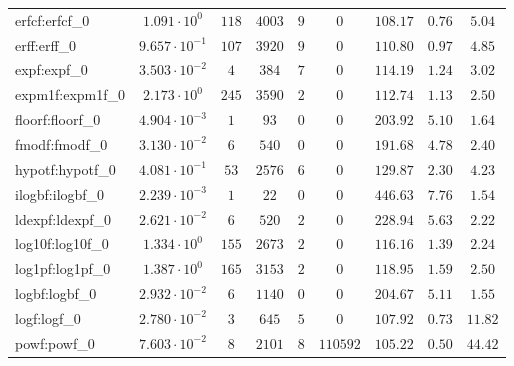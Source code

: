 \begin{tabular}{|l|c|c|c|c|c|c|c|c|}
erfcf:erfcf\_0               & $ 1.091 \cdot 10^{0}  $ & $ 118    $ & $ 4003   $ & $ 9   $ & $ 0      $ & $ 108.17      $ & $ 0.76    $ & $ 5.04    $ \\
erff:erff\_0                 & $ 9.657 \cdot 10^{-1} $ & $ 107    $ & $ 3920   $ & $ 9   $ & $ 0      $ & $ 110.80      $ & $ 0.97    $ & $ 4.85    $ \\
expf:expf\_0                 & $ 3.503 \cdot 10^{-2} $ & $ 4      $ & $ 384    $ & $ 7   $ & $ 0      $ & $ 114.19      $ & $ 1.24    $ & $ 3.02    $ \\
expm1f:expm1f\_0             & $ 2.173 \cdot 10^{0}  $ & $ 245    $ & $ 3590   $ & $ 2   $ & $ 0      $ & $ 112.74      $ & $ 1.13    $ & $ 2.50    $ \\
floorf:floorf\_0             & $ 4.904 \cdot 10^{-3} $ & $ 1      $ & $ 93     $ & $ 0   $ & $ 0      $ & $ 203.92      $ & $ 5.10    $ & $ 1.64    $ \\
fmodf:fmodf\_0               & $ 3.130 \cdot 10^{-2} $ & $ 6      $ & $ 540    $ & $ 0   $ & $ 0      $ & $ 191.68      $ & $ 4.78    $ & $ 2.40    $ \\
hypotf:hypotf\_0             & $ 4.081 \cdot 10^{-1} $ & $ 53     $ & $ 2576   $ & $ 6   $ & $ 0      $ & $ 129.87      $ & $ 2.30    $ & $ 4.23    $ \\
ilogbf:ilogbf\_0             & $ 2.239 \cdot 10^{-3} $ & $ 1      $ & $ 22     $ & $ 0   $ & $ 0      $ & $ 446.63      $ & $ 7.76    $ & $ 1.54    $ \\
ldexpf:ldexpf\_0             & $ 2.621 \cdot 10^{-2} $ & $ 6      $ & $ 520    $ & $ 2   $ & $ 0      $ & $ 228.94      $ & $ 5.63    $ & $ 2.22    $ \\
log10f:log10f\_0             & $ 1.334 \cdot 10^{0}  $ & $ 155    $ & $ 2673   $ & $ 2   $ & $ 0      $ & $ 116.16      $ & $ 1.39    $ & $ 2.24    $ \\
log1pf:log1pf\_0             & $ 1.387 \cdot 10^{0}  $ & $ 165    $ & $ 3153   $ & $ 2   $ & $ 0      $ & $ 118.95      $ & $ 1.59    $ & $ 2.50    $ \\
logbf:logbf\_0               & $ 2.932 \cdot 10^{-2} $ & $ 6      $ & $ 1140   $ & $ 0   $ & $ 0      $ & $ 204.67      $ & $ 5.11    $ & $ 1.55    $ \\
logf:logf\_0                 & $ 2.780 \cdot 10^{-2} $ & $ 3      $ & $ 645    $ & $ 5   $ & $ 0      $ & $ 107.92      $ & $ 0.73    $ & $ 11.82   $ \\
powf:powf\_0                 & $ 7.603 \cdot 10^{-2} $ & $ 8      $ & $ 2101   $ & $ 8   $ & $ 110592 $ & $ 105.22      $ & $ 0.50    $ & $ 44.42   $ \\

\end{tabular}
